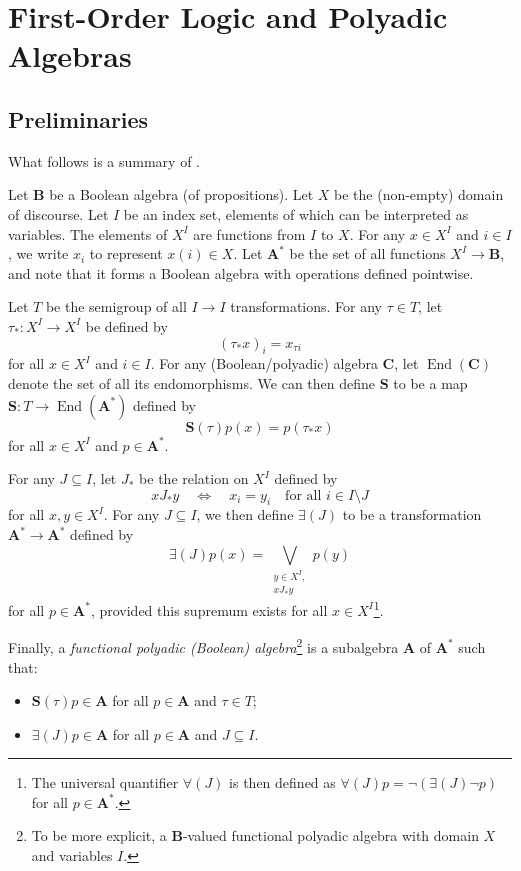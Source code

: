 \documentclass{article}
\theoremstyle{definition}
\theoremstyle{remark}
\DeclareMathOperator{\End}{End}
\begin{document}
\section{First-Order Logic and Polyadic Algebras}

\subsection{Preliminaries}

What follows is a summary of \cite{halmos2016algebraic}.

Let $\mathbf{B}$ be a Boolean algebra (of propositions). Let $X$ be the
(non-empty) domain of discourse. Let $I$ be an index set, elements of which can
be interpreted as variables. The elements of $X^I$ are functions from $I$ to
$X$. For any $x \in X^I$ and $i \in I$, we write $x_i$ to represent $x(i) \in
X$. Let $\mathbf{A^*}$ be the set of all functions $X^I \to \mathbf{B}$, and
note that it forms a Boolean algebra with operations defined pointwise.

Let $T$ be the semigroup of all $I \to I$ transformations. For any $\tau \in
T$, let $\tau_* : X^I \to X^I$ be defined by
\[
  (\tau_* x)_i = x_{\tau i}
\]
for all $x \in X^I$ and $i \in I$. For any (Boolean/polyadic) algebra
$\mathbf{C}$, let $\End(\mathbf{C})$ denote the set of all its endomorphisms. We
can then define $\mathbf{S}$ to be a map $\mathbf{S} : T \to \End(\mathbf{A^*})$
defined by
\[
  \mathbf{S}(\tau)p(x) = p(\tau_* x)
\]
for all $x \in X^I$ and $p \in \mathbf{A^*}$.

For any $J \subseteq I$, let $J_*$ be the relation on $X^I$ defined by
\[
  xJ_*y \quad \iff \quad x_i = y_i \quad \text{for all } i \in I \setminus J
\]
for all $x, y \in X^I$. For any $J \subseteq I$, we then define $\bm\exists(J)$
to be a transformation $\mathbf{A^*} \to \mathbf{A^*}$ defined by
\[
  \bm\exists(J)p(x) = \bigvee_{\substack{y \in X^I,\\ xJ_*y}} p(y)
\]
for all $p \in \mathbf{A^*}$, provided this supremum exists for all $x \in
X^I$\footnote{The universal quantifier $\bm\forall(J)$ is then defined as
  $\bm\forall(J)p = \neg(\bm\exists(J)\neg p)$ for all $p \in \mathbf{A^*}$.}.

Finally, a \emph{functional polyadic (Boolean) algebra}\footnote{To be more
  explicit, a $\mathbf{B}$-valued functional polyadic algebra with domain $X$
  and variables $I$.} is a subalgebra
$\mathbf{A}$ of $\mathbf{A^*}$ such that:
\begin{itemize}
\item $\mathbf{S}(\tau)p \in \mathbf{A}$ for all $p \in \mathbf{A}$ and $\tau
  \in T$;
\item $\bm\exists(J)p \in \mathbf{A}$ for all $p \in \mathbf{A}$ and $J
  \subseteq I$.
\end{itemize}
\end{document}
